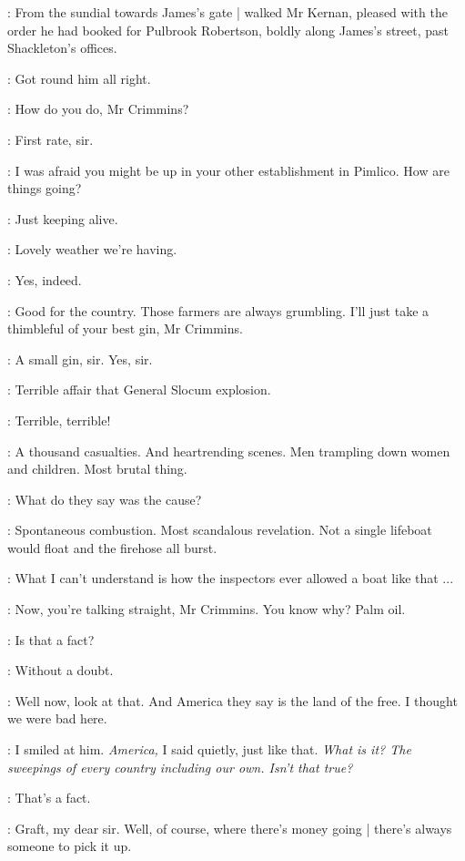:
From the sundial
towards James's gate |
walked Mr Kernan,
pleased with the order he had booked for Pulbrook Robertson,
boldly along James's street,
past Shackleton's offices.

:
Got round him all right.

:
How do you do, Mr Crimmins?

\crimmins:
First rate, sir.

:
I was afraid you might be up in your other establishment in Pimlico.
How are things going?

\crimmins:
Just keeping alive.

:
Lovely weather we're having.

\crimmins:
Yes, indeed.

:
Good for the country.
Those farmers are always grumbling.
I'll just take a thimbleful of your best gin, Mr Crimmins.

\crimmins:
A small gin, sir.
Yes, sir.

:
Terrible affair that General Slocum explosion.

\crimmins:
Terrible, terrible!

:
A thousand casualties.
And heartrending scenes.
Men trampling down women and children.
Most brutal thing.

\crimmins:
What do they say was the cause?

:
Spontaneous combustion.
Most scandalous revelation.
Not a single lifeboat would float and the firehose all burst.

\crimmins:
What I can't understand
is how the inspectors ever allowed a boat like that ...

:
Now, you're talking straight, Mr Crimmins.
You know why?
Palm oil.

\crimmins:
Is that a fact?

:
Without a doubt.

\crimmins:
Well now, look at that.
And America they say is the land of the free.
I thought we were bad here.

:
I smiled at him.
\emph{America,}
I said quietly,
just like that.
\emph{What is it?
The sweepings of every country including our own.
Isn't that true?}

\crimmins:
That's a fact.

:
Graft,
my dear sir.
Well, of course, where there's money going |
there's always someone to pick it up.

